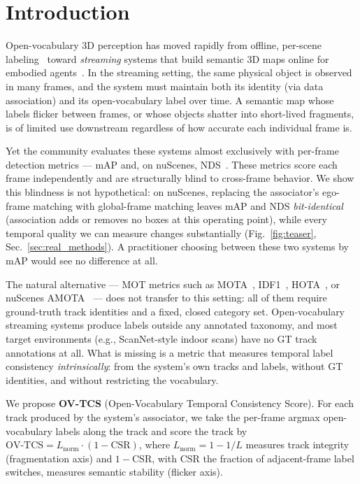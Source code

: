 \documentclass[10pt,twocolumn,letterpaper]{article}
\newcommand{\ovtcs}{\mathrm{OV\text{-}TCS}}
\newcommand{\csr}{\mathrm{CSR}}
\newcommand{\lnorm}{L_{\mathrm{norm}}}
\begin{document}
\section{Introduction}
\label{sec:intro}

Open-vocabulary 3D perception has moved rapidly from offline,
per-scene labeling~\cite{openscene,openmask3d,openyolo3d} toward
\emph{streaming} systems that build semantic 3D maps online for embodied
agents~\cite{conceptfusion}. In the streaming setting, the same physical
object is observed in many frames, and the system must maintain both its
identity (via data association) and its open-vocabulary label over time. A
semantic map whose labels flicker between frames, or whose objects shatter
into short-lived fragments, is of limited use downstream regardless of how
accurate each individual frame is.

Yet the community evaluates these systems almost exclusively with per-frame
detection metrics --- mAP and, on nuScenes, NDS~\cite{nuscenes}. These metrics
score each frame independently and are structurally blind to cross-frame
behavior. We show this blindness is not hypothetical: on nuScenes, replacing
the associator's ego-frame matching with global-frame matching leaves mAP and
NDS \emph{bit-identical} (association adds or removes no boxes at this
operating point), while every temporal quality we can measure changes
substantially (Fig.~\ref{fig:teaser}, Sec.~\ref{sec:real_methods}). A
practitioner choosing between these two systems by mAP would see no
difference at all.

The natural alternative --- MOT metrics such as MOTA~\cite{clearmot},
IDF1~\cite{idf1}, HOTA~\cite{hota}, or nuScenes AMOTA~\cite{nuscenes_tracking}
--- does not transfer to this setting: all of them require ground-truth track
identities and a fixed, closed category set. Open-vocabulary streaming systems
produce labels outside any annotated taxonomy, and most target environments
(e.g., ScanNet-style indoor scans) have no GT track annotations at all. What
is missing is a metric that measures temporal label consistency
\emph{intrinsically}: from the system's own tracks and labels, without GT
identities, and without restricting the vocabulary.

We propose \textbf{OV-TCS} (Open-Vocabulary Temporal Consistency Score). For
each track produced by the system's associator, we take the per-frame argmax
open-vocabulary labels along the track and score the track by
$\ovtcs = \lnorm\cdot(1-\csr)$, where $\lnorm = 1-1/L$ measures track
integrity (fragmentation axis) and $1-\csr$, with $\csr$ the fraction of
adjacent-frame label switches, measures semantic stability (flicker axis).
\end{document}
